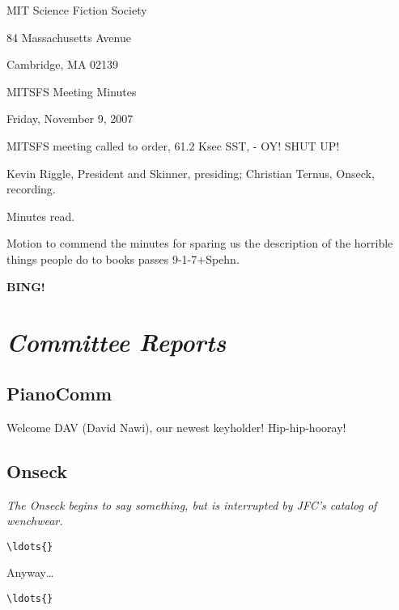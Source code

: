 \documentclass[10pt]{article}
\newcommand{\bing}{{\bf BING!} }
\newcommand{\goto}[1]{\bing \vskip 12pt \section*{{\em{#1}}}}
\begin{document}
\begin{center}

MIT Science Fiction Society

84 Massachusetts Avenue

Cambridge, MA 02139

\vspace{12pt}

MITSFS Meeting Minutes

Friday, November 9, 2007

\end{center}

\vspace{18pt}

\setlength{\parskip}{6pt}

\noindent
MITSFS meeting called to order, 61.2 Ksec SST, - OY!  SHUT UP!

Kevin Riggle, President and Skinner, presiding; Christian Ternus, Onseck, recording.

Minutes read.

Motion to commend the minutes for sparing us the description of the horrible things people do to books passes 9-1-7+Spehn.

\BING

\goto{Committee Reports}



\subsection*{PianoComm}

Welcome DAV (David Nawi), our newest keyholder! Hip-hip-hooray!

\subsection*{Onseck}

\emph{The Onseck begins to say something, but is interrupted by JFC's catalog of wenchwear.}
\begin{verbatim}
\ldots{}
\end{verbatim}
Anyway\ldots{}
\begin{verbatim}
\ldots{}
\end{verbatim}
\end{document}
